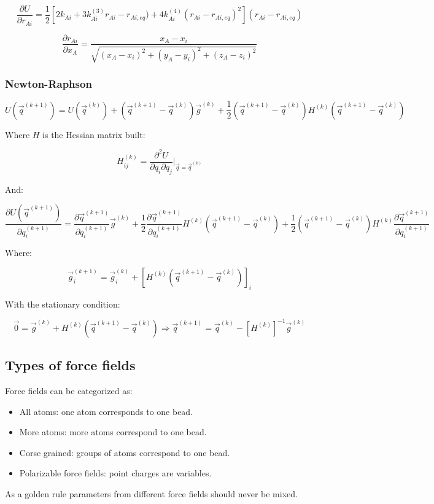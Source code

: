 	$$\frac{\partial U}{\partial r_{Ai}} = \frac{1}{2}[2k_{Ai}+3k_{Ai}^{(3)}r_{Ai}-r_{Ai, eq}) + 4k^{(4)}_{Ai}(r_{Ai}-r_{Ai, eq})^2](r_{Ai}-r_{Ai, eq})$$

	$$\frac{\partial r_{Ai}}{\partial x_A} = \frac{x_A-x_i}{\sqrt{(x_A-x_i)^2+(y_A-y_i)^2+(z_A-z_i)^2}}$$

		\subsubsection{Newton-Raphson}

		$$U(\vec{q}^{(k+1)}) = U(\vec{q}^{(k)}) + (\vec{q}^{(k+1)} -\vec{q}^{(k)})\vec{g}^{(k)} + \frac{1}{2}(\vec{q}^{(k+1)}-\vec{q}^{(k)})H^{(k)}(\vec{q}^{(k+1)}-\vec{q}^{(k)})$$

		Where $H$ is the Hessian matrix built:

		$$H_{ij}^{(k)} = \frac{\partial^2 U}{\partial q_i\partial q_j}|_{\vec{q}=\vec{q}^{(k)}}$$

		And:

		$$\frac{\partial U(\vec{q}^{(k+1)})}{\partial q_i^{(k+1)}} = \frac{\partial \vec{q}^{(k+1)}}{\partial q_i^{(k+1)}}\vec{g}^{(k)}+ \frac{1}{2}\frac{\partial \vec{q}^{(k+1)}}{\partial q_i^{(k+1)}}H^{(k)}(\vec{q}^{(k+1)}-\vec{q}^{(k)})+\frac{1}{2}(\vec{q}^{(k+1)}-\vec{q}^{(k)})H^{(k)}\frac{\partial \vec{q}^{(k+1)}}{\partial q_i^{(k+1)}}$$

		Where:

		$$\vec{g}_i^{(k+1)} = \vec{g}_i^{(k)} + [H^{(k)}(\vec{q}^{(k+1)}-\vec{q}^{(k)})]_i$$

		With the stationary condition:

		$$\vec{0} = \vec{g}^{(k)} + H^{(k)}(\vec{q}^{(k+1)}-\vec{q}^{(k)})\Rightarrow \vec{q}^{(k+1)} = \vec{q}^{(k)} - [H^{(k)}]^{-1}\vec{g}^{(k)}$$

	\subsection{Types of force fields}
	Force fields can be categorized as:

	\begin{multicols}{2}
		\begin{itemize}
			\item All atoms: one atom corresponds to one bead.
			\item More atoms: more atoms correspond to one bead.
			\item Corse grained: groups of atoms correspond to one bead.
			\item Polarizable force fields: point charges are variables.
		\end{itemize}
	\end{multicols}

	As a golden rule parameters from different force fields should never be mixed.
